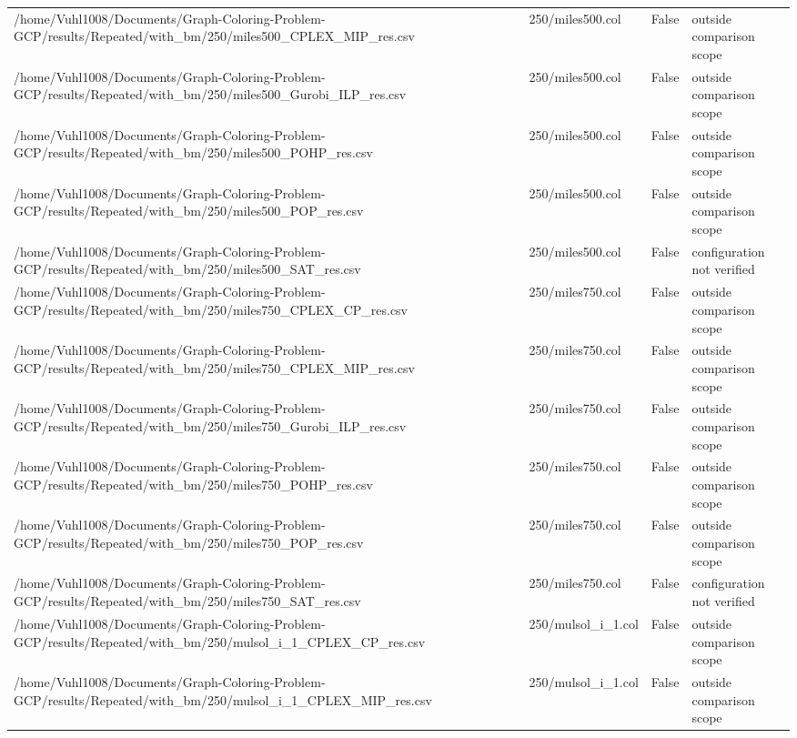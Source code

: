 \begin{table}[htbp]
\begin{tabular}{llll}
/home/Vuhl1008/Documents/Graph-Coloring-Problem-GCP/results/Repeated/with\_bm/250/miles500\_CPLEX\_MIP\_res.csv & 250/miles500.col & False & outside comparison scope \\
/home/Vuhl1008/Documents/Graph-Coloring-Problem-GCP/results/Repeated/with\_bm/250/miles500\_Gurobi\_ILP\_res.csv & 250/miles500.col & False & outside comparison scope \\
/home/Vuhl1008/Documents/Graph-Coloring-Problem-GCP/results/Repeated/with\_bm/250/miles500\_POHP\_res.csv & 250/miles500.col & False & outside comparison scope \\
/home/Vuhl1008/Documents/Graph-Coloring-Problem-GCP/results/Repeated/with\_bm/250/miles500\_POP\_res.csv & 250/miles500.col & False & outside comparison scope \\
/home/Vuhl1008/Documents/Graph-Coloring-Problem-GCP/results/Repeated/with\_bm/250/miles500\_SAT\_res.csv & 250/miles500.col & False & configuration not verified \\
/home/Vuhl1008/Documents/Graph-Coloring-Problem-GCP/results/Repeated/with\_bm/250/miles750\_CPLEX\_CP\_res.csv & 250/miles750.col & False & outside comparison scope \\
/home/Vuhl1008/Documents/Graph-Coloring-Problem-GCP/results/Repeated/with\_bm/250/miles750\_CPLEX\_MIP\_res.csv & 250/miles750.col & False & outside comparison scope \\
/home/Vuhl1008/Documents/Graph-Coloring-Problem-GCP/results/Repeated/with\_bm/250/miles750\_Gurobi\_ILP\_res.csv & 250/miles750.col & False & outside comparison scope \\
/home/Vuhl1008/Documents/Graph-Coloring-Problem-GCP/results/Repeated/with\_bm/250/miles750\_POHP\_res.csv & 250/miles750.col & False & outside comparison scope \\
/home/Vuhl1008/Documents/Graph-Coloring-Problem-GCP/results/Repeated/with\_bm/250/miles750\_POP\_res.csv & 250/miles750.col & False & outside comparison scope \\
/home/Vuhl1008/Documents/Graph-Coloring-Problem-GCP/results/Repeated/with\_bm/250/miles750\_SAT\_res.csv & 250/miles750.col & False & configuration not verified \\
/home/Vuhl1008/Documents/Graph-Coloring-Problem-GCP/results/Repeated/with\_bm/250/mulsol\_i\_1\_CPLEX\_CP\_res.csv & 250/mulsol\_i\_1.col & False & outside comparison scope \\
/home/Vuhl1008/Documents/Graph-Coloring-Problem-GCP/results/Repeated/with\_bm/250/mulsol\_i\_1\_CPLEX\_MIP\_res.csv & 250/mulsol\_i\_1.col & False & outside comparison scope \\

\end{tabular}
\end{table}
